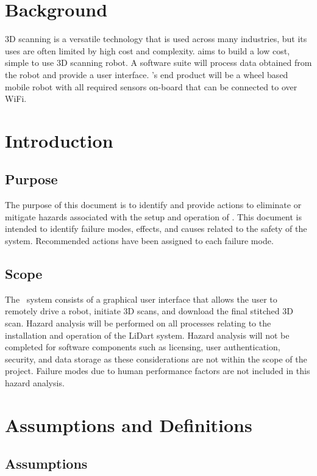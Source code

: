 \documentclass[12pt]{article}
\begin{document}

\section{Background}

3D scanning is a versatile technology that is used across many industries, but its uses are often limited by high cost
and complexity. \progname aims to build a low cost, simple to use 3D scanning robot. A software suite will process
data obtained from the robot and provide a user interface. \progname’s end product will be a wheel based mobile robot
with all required sensors on-board that can be connected to over WiFi.

\section{Introduction}

\subsection{Purpose}

The purpose of this document is to identify and provide actions to eliminate or mitigate hazards associated with the setup and operation of \progname. This document is intended to identify failure modes, effects, and causes related to the safety of the system. Recommended actions have been assigned to each failure mode.

\subsection{Scope}
The \progname ~system consists of a graphical user interface that allows the user to remotely drive a robot, initiate 3D scans, and download the final stitched 3D scan. Hazard analysis will be performed on all processes relating to the installation and operation of the LiDart system.  Hazard analysis will not be completed for software components such as licensing, user authentication, security, and data storage as these considerations are not within the scope of the project. Failure modes due to human performance factors are not included in this hazard analysis.

\section{Assumptions and Definitions}

\subsection{Assumptions}
\end{document}
